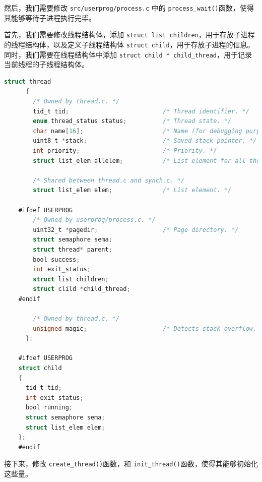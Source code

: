 \documentclass{article}
\begin{document}
然后，我们需要修改 \texttt{src/userprog/process.c} 中的 \texttt{process\_wait()}函数，使得其能够等待子进程执行完毕。

首先，我们需要修改线程结构体，添加 \texttt{struct list children}，用于存放子进程的线程结构体，以及定义子线程结构体 \texttt{struct child}，用于存放子进程的信息。同时，我们需要在线程结构体中添加 \texttt{struct child * child\_thread}，用于记录当前线程的子线程结构体。

\begin{lstlisting}[language=C, title=\texttt{src/threads/thread.h}]
    struct thread
      {
        /* Owned by thread.c. */
        tid_t tid;                          /* Thread identifier. */
        enum thread_status status;          /* Thread state. */
        char name[16];                      /* Name (for debugging purposes). */
        uint8_t *stack;                     /* Saved stack pointer. */
        int priority;                       /* Priority. */
        struct list_elem allelem;           /* List element for all threads list. */

        /* Shared between thread.c and synch.c. */
        struct list_elem elem;              /* List element. */

    #ifdef USERPROG
        /* Owned by userprog/process.c. */
        uint32_t *pagedir;                  /* Page directory. */
        struct semaphore sema;
        struct thread* parent;
        bool success;
        int exit_status;
        struct list children;
        struct clild *child_thread;
    #endif

        /* Owned by thread.c. */
        unsigned magic;                     /* Detects stack overflow. */
      };

    #ifdef USERPROG
    struct child
    {
      tid_t tid;
      int exit_status;
      bool running;
      struct semaphore sema;
      struct list_elem elem;
    };
    #endif

\end{lstlisting}

接下来，修改 \texttt{create\_thread()}函数，和 \texttt{init\_thread()}函数，使得其能够初始化这些量。
\end{document}
